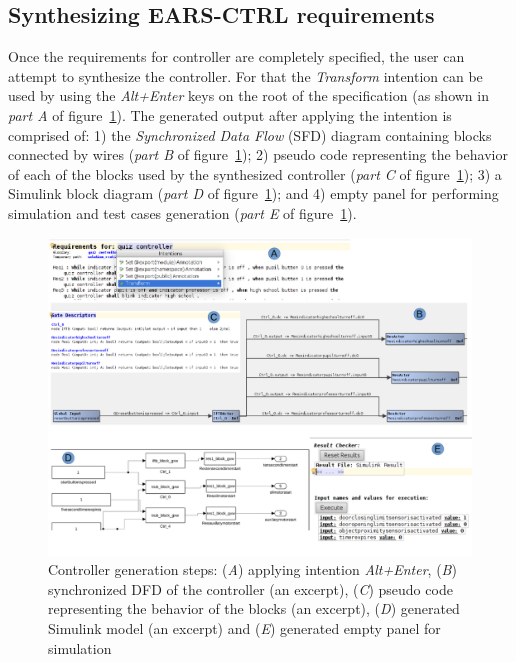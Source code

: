 \subsection{Synthesizing \textsf{EARS-CTRL} requirements}
\label{SynthReq}
\vspace{-0cm}
Once the requirements for controller are completely specified, the user can
attempt to synthesize the controller. For that the \emph{Transform} intention
can be used by using the \emph{Alt+Enter} keys on the root of the specification
(as shown in \emph{part A} of figure~\ref{fig:Spec_transform}). The generated
output after applying the intention is comprised of: 1) the  \emph{Synchronized
Data Flow} (SFD) diagram containing blocks connected by wires (\emph{part B} of
figure~\ref{fig:Spec_transform}); 2) pseudo code representing the behavior of each of the blocks used
by the synthesized controller (\emph{part C} of
figure~\ref{fig:Spec_transform}); 3) a Simulink block
diagram (\emph{part D} of figure~\ref{fig:Spec_transform}); and 4) empty panel
for performing simulation and test cases generation (\emph{part E} of
figure~\ref{fig:Spec_transform}).
\begin{figure}[!h]
\centering
\includegraphics[width=1\textwidth]{./images/Transform.png}
\caption{Controller generation steps: (\emph{A}) applying intention \emph{Alt+Enter},
(\emph{B}) synchronized DFD of the controller (an excerpt), (\emph{C}) pseudo
code representing the behavior of the blocks (an excerpt), (\emph{D})
generated Simulink model (an excerpt) and (\emph{E})
generated empty panel for simulation}
\label{fig:Spec_transform}
\end{figure}
\vspace{-.5cm}
